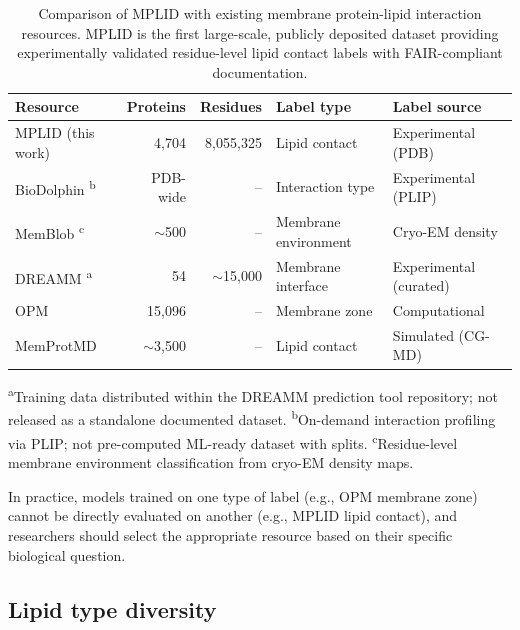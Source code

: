 \documentclass[unnumsec,webpdf,contemporary,large]{oup-authoring-template}
\begin{document}
\begin{table}[tbp]
\centering
\caption{Comparison of MPLID with existing membrane protein-lipid interaction resources. MPLID is the first large-scale, publicly deposited dataset providing experimentally validated residue-level lipid contact labels with FAIR-compliant documentation.}
\label{tab:comparison}
\small
\begin{tabular}{@{}lrrll@{}}
\toprule
\textbf{Resource} & \textbf{Proteins} & \textbf{Residues} & \textbf{Label type} & \textbf{Label source} \\
\midrule
MPLID (this work) & 4,704 & 8,055,325 & Lipid contact & Experimental (PDB) \\
BioDolphin \cite{biodolphin2024}\textsuperscript{b} & PDB-wide & -- & Interaction type & Experimental (PLIP) \\
MemBlob \cite{memblob2019}\textsuperscript{c} & $\sim$500 & -- & Membrane environment & Cryo-EM density \\
DREAMM \cite{chatzigoulas2022}\textsuperscript{a} & 54 & $\sim$15,000 & Membrane interface & Experimental (curated) \\
OPM \cite{lomize2012} & 15,096 & -- & Membrane zone & Computational \\
MemProtMD \cite{newport2019} & $\sim$3,500 & -- & Lipid contact & Simulated (CG-MD) \\
\bottomrule
\end{tabular}

\vspace{1mm}
\footnotesize{\textsuperscript{a}Training data distributed within the DREAMM prediction tool repository; not released as a standalone documented dataset. \textsuperscript{b}On-demand interaction profiling via PLIP; not pre-computed ML-ready dataset with splits. \textsuperscript{c}Residue-level membrane environment classification from cryo-EM density maps.}
\end{table}

In practice, models trained on one type of label (e.g., OPM membrane zone) cannot be directly evaluated on another (e.g., MPLID lipid contact), and researchers should select the appropriate resource based on their specific biological question.

\subsection{Lipid type diversity}
\end{document}
